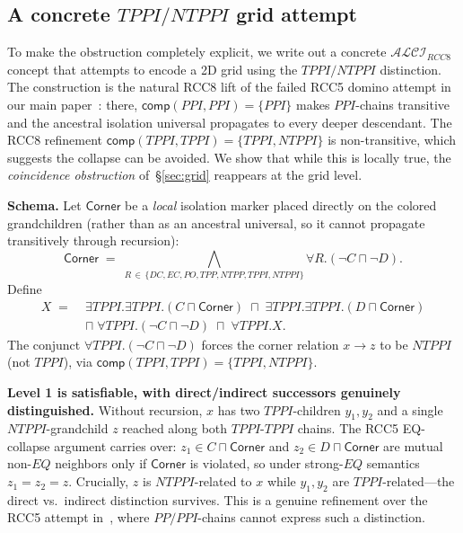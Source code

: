 \documentclass[11pt]{article}
\newcommand{\ALCIRCC}[1]{\ensuremath{\mathcal{ALCI}_{\mathit{RCC#1}}}}
\newcommand{\comp}{\mathsf{comp}}
\begin{document}
\subsection{A concrete $TPPI/NTPPI$ grid attempt}
\label{sec:concrete-tppi-attempt}

To make the obstruction completely explicit, we write out a concrete
$\ALCIRCC{8}$ concept that attempts to encode a 2D grid using the
$TPPI/NTPPI$ distinction.  The construction is the natural RCC8 lift
of the failed RCC5 domino attempt in our main paper~\cite{OurMainPaper}:
there, $\comp(PPI,PPI) = \{PPI\}$ makes $PPI$-chains transitive and
the ancestral isolation universal propagates to every deeper
descendant.  The RCC8 refinement $\comp(TPPI,TPPI) = \{TPPI,NTPPI\}$
is non-transitive, which suggests the collapse can be avoided.  We
show that while this is locally true, the \emph{coincidence
obstruction} of~\S\ref{sec:grid} reappears at the grid level.

\medskip\noindent\textbf{Schema.}  Let $\mathsf{Corner}$ be a
\emph{local} isolation marker placed directly on the colored
grandchildren (rather than as an ancestral universal, so it cannot
propagate transitively through recursion):
\[
  \mathsf{Corner} \;=\;
  \bigwedge_{R \,\in\, \{DC,EC,PO,TPP,NTPP,TPPI,NTPPI\}}
    \forall R.(\neg C \sqcap \neg D).
\]
Define
\begin{align*}
  X \;=\; &\exists TPPI.\exists TPPI.(C \sqcap \mathsf{Corner})
    \;\sqcap\; \exists TPPI.\exists TPPI.(D \sqcap \mathsf{Corner}) \\
  &\sqcap\; \forall TPPI.(\neg C \sqcap \neg D)
    \;\sqcap\; \forall TPPI.X.
\end{align*}
The conjunct $\forall TPPI.(\neg C \sqcap \neg D)$ forces the corner
relation $x \to z$ to be $NTPPI$ (not $TPPI$), via
$\comp(TPPI,TPPI) = \{TPPI,NTPPI\}$.

\medskip\noindent\textbf{Level 1 is satisfiable, with direct/indirect
successors genuinely distinguished.}  Without recursion, $x$ has two
$TPPI$-children $y_1, y_2$ and a single $NTPPI$-grandchild $z$
reached along both $TPPI$-$TPPI$ chains.  The RCC5 EQ-collapse
argument carries over: $z_1 \in C \sqcap \mathsf{Corner}$ and
$z_2 \in D \sqcap \mathsf{Corner}$ are mutual non-$EQ$ neighbors only
if $\mathsf{Corner}$ is violated, so under strong-$EQ$ semantics
$z_1 = z_2 = z$.  Crucially, $z$ is $NTPPI$-related to $x$ while
$y_1, y_2$ are $TPPI$-related---the direct vs.~indirect distinction
survives.  This is a genuine refinement over the RCC5 attempt
in~\cite{OurMainPaper}, where $PP/PPI$-chains cannot express such a
distinction.
\end{document}

